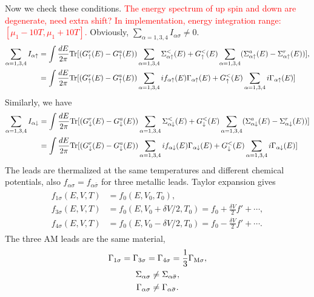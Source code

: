 \documentclass[aps,prb,superscriptaddress]{revtex4-2}
\begin{document}
Now we check these conditions. \textcolor{red}{The energy spectrum of up spin and down are degenerate, need extra shift? In implementation, energy integration range: $[\mu_1-10T, \mu_1+10T]$.} Obviously, $\sum_{\alpha=1,3,4}I_{\alpha\sigma}\neq 0$.
\begin{gather}
\begin{split}
\sum_{\alpha=1,3,4}I_{\alpha\uparrow} &= \int \frac{dE}{2\pi} {\rm Tr} [(G_{\uparrow}^r(E)-G_{\uparrow}^a(E))\sum_{\alpha=1,3,4} \Sigma^<_{\alpha\uparrow}(E) + G_{\uparrow}^<(E) \sum_{\alpha=1,3,4}(\Sigma_{\alpha\uparrow}^a(E) -\Sigma_{\alpha\uparrow}^r(E))],\\
& = \int \frac{dE}{2\pi} {\rm Tr} [(G_{\uparrow}^r(E)-G_{\uparrow}^a(E))\sum_{\alpha=1,3,4} if_{\alpha\uparrow}(E)\Gamma_{\alpha\uparrow}(E) + G_{\uparrow}^<(E) \sum_{\alpha=1,3,4}i\Gamma_{\alpha\uparrow}(E)] \\
\end{split}
\end{gather}
Similarly, we have
\begin{gather}
\begin{split}
\sum_{\alpha=1,3,4}I_{\alpha\downarrow} &= \int \frac{dE}{2\pi} {\rm Tr} [(G_{\downarrow}^r(E)-G_{\downarrow}^a(E))\sum_{\alpha=1,3,4} \Sigma^<_{\alpha\downarrow}(E) + G_{\downarrow}^<(E) \sum_{\alpha=1,3,4}(\Sigma_{\alpha\downarrow}^a(E) -\Sigma_{\alpha\downarrow}^r(E))]\\
&=\int \frac{dE}{2\pi} {\rm Tr} [(G_{\downarrow}^r(E)-G_{\downarrow}^a(E))\sum_{\alpha=1,3,4} if_{\alpha\downarrow}(E)\Gamma_{\alpha\downarrow}(E) + G_{\downarrow}^<(E) \sum_{\alpha=1,3,4}i\Gamma_{\alpha\downarrow}(E)]
\end{split}
\end{gather}
The leads are thermalized at the same temperatures and different chemical potentials, also $f_{\alpha\sigma}=f_{\alpha\bar\sigma}$ for three metallic leads. Taylor expansion gives
\begin{gather}
\begin{split}
f_{1\sigma}(E, V, T) &= f_0(E, V_0, T_0),\\
f_{3\sigma}(E, V, T) &= f_0(E, V_0+\delta V/2, T_0)=f_0+\frac{\delta V}{2} f'+\cdots,\\
f_{4\sigma}(E, V, T) &= f_0(E, V_0-\delta V/2, T_0)=f_0-\frac{\delta V}{2} f'+\cdots.
\end{split}
\end{gather}
The three AM leads are the same material,
\begin{gather}
\Gamma_{1\sigma} = \Gamma_{3\sigma}=\Gamma_{4\sigma}=\frac{1}{3}\Gamma_{{\rm M}\sigma},\\
\Sigma_{\alpha\sigma} \neq \Sigma_{\alpha\bar\sigma},\\
\Gamma_{\alpha\sigma} \neq \Gamma_{\alpha\bar\sigma}.
\end{gather}
\end{document}
